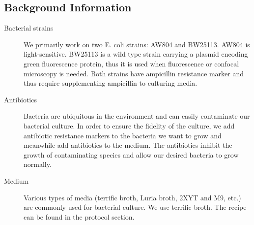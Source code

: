 \subsection{Background Information}
\begin{description}
  \item [Bacterial strains] We primarily work on two E. coli strains: AW804 and BW25113. AW804 is light-sensitive. BW25113 is a wild type strain carrying a plasmid encoding green fluorescence protein, thus it is used when fluorescence or confocal microscopy is needed. Both strains have ampicillin resistance marker and thus require supplementing ampicillin to culturing media.
  \item [Antibiotics] Bacteria are ubiquitous in the environment and can easily  contaminate our bacterial culture. In order to ensure the fidelity of the culture, we add antibiotic resistance markers to the bacteria we want to grow and meanwhile add antibiotics to the medium. The antibiotics inhibit the growth of contaminating species and allow our desired bacteria to grow normally.
  \item [Medium] Various types of media (terrific broth, Luria broth, 2XYT and M9, etc.) are commonly used for bacterial culture. We use terrific broth. The recipe can be found in the protocol section.
\end{description}

